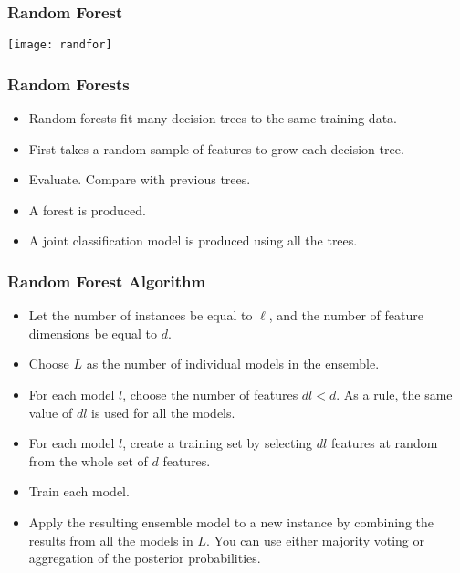 \begin{frame}[fragile]\frametitle{Random Forest}
\begin{center}
\texttt{[image: randfor]}
\end{center}
\end{frame}







\begin{frame}[fragile] \frametitle{Random Forests}

\begin{itemize}
\item Random forests fit many decision trees to the same training data.
\item First takes a random sample of features to grow each decision tree.
\item Evaluate. Compare with previous trees.
\item A forest is produced.
\item A joint classification model is produced using all the trees.
\end{itemize}
\end{frame}

\begin{frame}[fragile]\frametitle{Random Forest Algorithm}
\begin{itemize}
\item Let the number of instances be equal to $\ell$, and the number of feature dimensions be equal to $d$.
\item Choose $L$ as the number of individual models in the ensemble.
\item For each model $l$, choose the number of features $dl<d$. As a rule, the same value of $dl$ is used for all the models.
\item For each model $l$, create a training set by selecting $dl$ features at random from the whole set of $d$ features.
\item Train each model.
\item Apply the resulting ensemble model to a new instance by combining the results from all the models in $L$. You can use either majority voting or aggregation of the posterior probabilities.

\end{itemize}
\end{frame}


